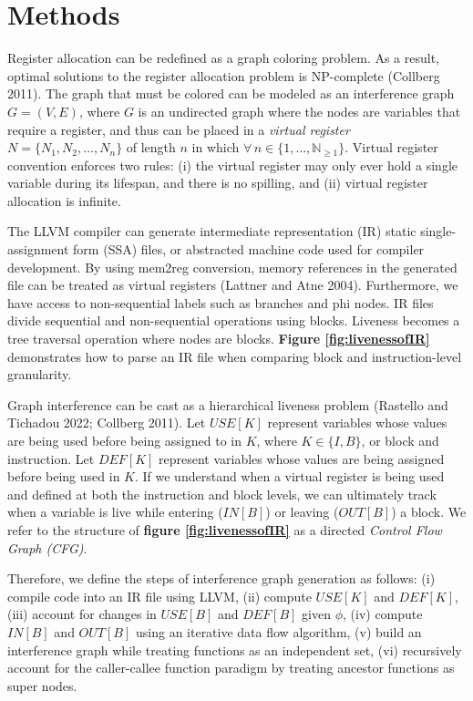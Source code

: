 \documentclass{article}
\begin{document}
\section{Methods}

Register allocation can be redefined as a graph coloring problem. As a result, optimal solutions to the register allocation problem is NP-complete (Collberg 2011). The graph that must be colored can be modeled as an interference graph $G = (V, E)$, where $G$ is an undirected graph where the nodes are variables that require a register, and thus can be placed in a \textit{virtual register} $N = \{N_1, N_2, \ldots, N_n\}$ of length $n$ in which $\forall\, n \in \{1,\ldots,\mathbb{N}_{\ge 1}\}$. Virtual register convention enforces two rules: (i) the virtual register may only ever hold a single variable during its lifespan, and there is no spilling, and (ii) virtual register allocation is infinite. 

The LLVM compiler can generate intermediate representation (IR) static single-assignment form (SSA) files, or abstracted machine code used for compiler development. By using mem2reg conversion, memory references in the generated file can be treated as virtual registers (Lattner and Atne 2004). Furthermore, we have access to non-sequential labels such as branches and phi nodes. IR files divide sequential and non-sequential operations using blocks. Liveness becomes a tree traversal operation where nodes are blocks. \textbf{Figure \ref{fig:livenessofIR}} demonstrates how to parse an IR file when comparing block and instruction-level granularity. 

Graph interference can be cast as a hierarchical liveness problem (Rastello and Tichadou 2022; Collberg 2011). Let $\textit{USE}[K]$ represent variables whose values are being used before being assigned to in $K$, where $K \in \{I,B\} $, or block and instruction. Let $\textit{DEF}[K]$ represent variables whose values are being assigned before being used in $K$. If we understand when a virtual register is being used and defined at both the instruction and block levels, we can ultimately track when a variable is live while entering ($\textit{IN}[B]$) or leaving ($\textit{OUT}[B]$) a block. We refer to the structure of \textbf{figure \ref{fig:livenessofIR}} as a directed \textit{Control Flow Graph (CFG)}.

Therefore, we define the steps of interference graph generation as follows: (i) compile code into an IR file using LLVM, (ii) compute $\textit{USE}[K]$ and $\textit{DEF}[K]$, (iii) account for changes in $\textit{USE}[B]$ and $\textit{DEF}[B]$ given $\phi$, (iv) compute $\textit{IN}[B]$ and $\textit{OUT}[B]$ using an iterative data flow algorithm, (v) build an interference graph while treating functions as an independent set, (vi) recursively account for the caller-callee function paradigm by treating ancestor functions as super nodes. 
\end{document}

